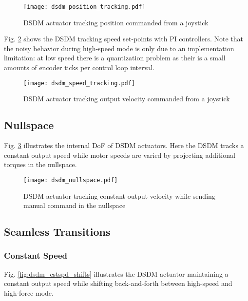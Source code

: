 \begin{figure}[htp]
	\centering
		\texttt{[image: dsdm\_position\_tracking.pdf]}
	\caption[DSDM actuator position control]{DSDM actuator tracking position commanded from a joystick }
	\label{fig:dsdm_position_tracking}
\end{figure}


Fig. \ref{fig:dsdm_speed_tracking} shows the DSDM tracking speed set-points with PI controllers. Note that the noisy behavior during high-speed mode is only due to an implementation limitation: at low speed there is a quantization problem as their is a small amounts of encoder ticks per control loop interval. 


\begin{figure}[htp]
	\centering
		\texttt{[image: dsdm\_speed\_tracking.pdf]}
	\caption[DSDM actuator velocity control]{DSDM actuator tracking output velocity commanded from a joystick }
	\label{fig:dsdm_speed_tracking}
\end{figure}


\subsection{Nullspace}

Fig. \ref{fig:dsdm_nullspace} illustrates the internal DoF of DSDM actuators. Here the DSDM tracks a constant output speed while motor speeds are varied by projecting additional torques in the nullspace.

\begin{figure}[htp]
	\centering
		\texttt{[image: dsdm\_nullspace.pdf]}
	\caption[DSDM actuator tracking constant output velocity: nullspace]{DSDM actuator tracking constant output velocity while sending manual command in the nullspace }
	\label{fig:dsdm_nullspace}
\end{figure}


\subsection{Seamless Transitions}

\subsubsection{Constant Speed}

Fig. \ref{fig:dsdm_cstspd_shifts} illustrates the DSDM actuator maintaining a constant output speed while shifting back-and-forth between high-speed and high-force mode.

